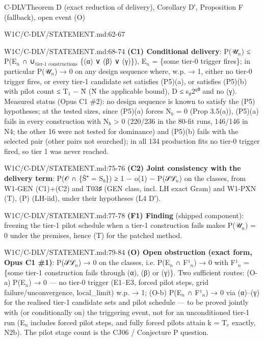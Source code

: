 \begin{card}{C-DLV}{Theorem D (exact reduction of delivery), Corollary D′, Proposition F (fallback), open event (O)}
\begin{stmt}{W1C/C-DLV/STATEMENT.md:62-67}
\end{stmt}
\begin{stmt}{W1C/C-DLV/STATEMENT.md:68-74}
\textbf{(C1) Conditional delivery}: P(𝒰$_{n}$) ≤ P(E$_{n}$ ∩ ∪$_{\mbox{tier-1 constructions}}$ \{(α) ∨ (β) ∨ (γ)\}), E$_{n}$ = \{some tier-0 trigger
fires\}; in particular P(𝒰$_{n}$) → 0 on any design sequence where, w.p. → 1, either no tier-0 trigger fires, or every
tier-1 candidate set satisfies (P5)(a), or satisfies (P5)(b) with pilot count ≤ T₁ − N̄ (N̄ the applicable bound),
D ≤ s$_{\theta}$2⁶⁰ and no (γ). Measured status (Opus C1 \#2): no design sequence is known to satisfy the (P5) hypotheses; at the
tested sizes, since (P5)(a) forces N$_{b}$ = 0 (Prop 3.5(a)), (P5)(a) fails in every construction with N$_{b}$ > 0 (220/236
in the 80-fit runs, 146/146 in N4; the other 16 were not tested for dominance) and (P5)(b) fails with the selected pair (other pairs not
searched); in all 134 production fits no tier-0 trigger fired, so tier 1 was never reached.
\end{stmt}
\begin{stmt}{W1C/C-DLV/STATEMENT.md:75-76}
\textbf{(C2) Joint consistency with the delivery term}: P(𝒪 ∩ \{Ŝ⁺ = S₀\}) ≥ 1 − o(1) − P(𝒮ℒ$_{n}$) on the classes, from W1-GEN
(C1)+(C2) and T03♯ (GEN class, incl. LH exact Gram) and W1-PXN (T), (P) (LH-iid), under their hypotheses (L4 D′).
\end{stmt}
\begin{stmt}{W1C/C-DLV/STATEMENT.md:77-78}
\textbf{(F1) Finding} (shipped component): freezing the tier-1 pilot schedule when a tier-1 construction fails makes
P(𝒰$_{n}$) = 0 under the premises, hence (T) for the patched method.
\end{stmt}
\begin{stmt}{W1C/C-DLV/STATEMENT.md:79-84}
\textbf{(O) Open obstruction (exact form, Opus C1 \#1)}: P(𝒮ℒ$_{n}$) → 0 on the classes, i.e. P(E$_{n}$ ∩ F¹$_{n}$) → 0 with
F¹$_{n}$ = \{some tier-1 construction fails through (α), (β) or (γ)\}. Two sufficient routes: (O-a) P(E$_{n}$) → 0 — no tier-0
trigger (E1–E3, forced pilot steps, grid failure/unconvergence, local\_limit) w.p. → 1; (O-b) P(E$_{n}$ ∩ F¹$_{n}$) → 0 via
(α)–(γ) for the realised tier-1 candidate sets and pilot schedule — to be proved jointly with (or conditionally on) the
triggering event, not for an unconditioned tier-1 run (E$_{n}$ includes forced pilot steps, and fully forced pilots attain
k = T$_{e}$ exactly, N2b). The pilot stage count is the CJ06 / Conjecture P question.
\end{stmt}


\end{card}
